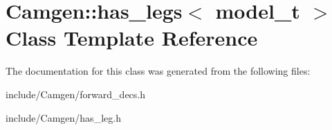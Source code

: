 \hypertarget{a00261}{\section{Camgen\-:\-:has\-\_\-legs$<$ model\-\_\-t $>$ Class Template Reference}
\label{a00261}
}


The documentation for this class was generated from the following files\-:\begin{DoxyCompactItemize}
\item 
include/\-Camgen/forward\-\_\-decs.\-h\item 
include/\-Camgen/has\-\_\-leg.\-h\end{DoxyCompactItemize}
